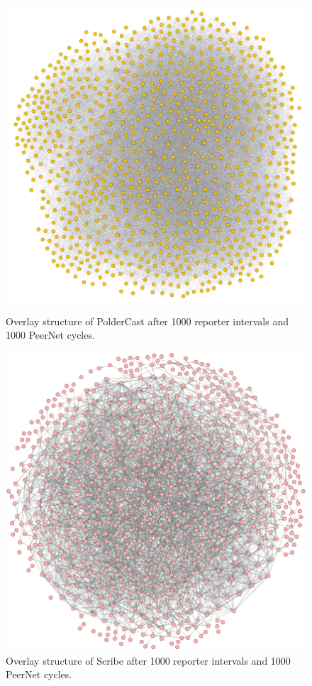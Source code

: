 \begin{figure}[h!]
    \centering
    \includegraphics[scale=0.4]{figures/polder_struct}
    \caption{Overlay structure of PolderCast after 1000 reporter
        intervals and 1000 PeerNet cycles.}
    \label{fig:struct_scribe}
    \includegraphics[scale=0.4]{figures/scribe_struct}
    \caption{Overlay structure of Scribe after 1000 reporter
        intervals and 1000 PeerNet cycles.}
    \label{fig:struct_poldercast}
\end{figure}

